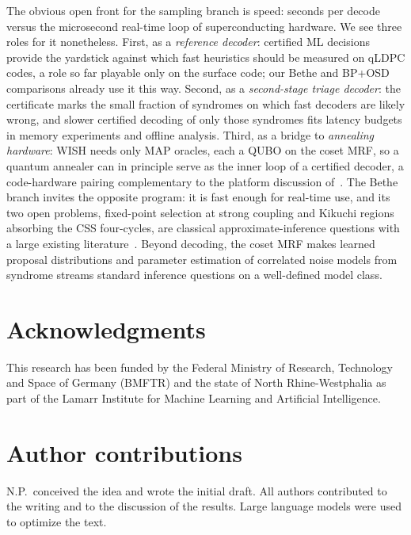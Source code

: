 \documentclass[a4paper,11pt]{quantumarticle}
\theoremstyle{definition}
\begin{document}
The obvious open front for the sampling branch is speed: seconds per
decode versus the microsecond real-time loop of superconducting hardware.
We see three roles for it nonetheless. First, as a \emph{reference
decoder}: certified ML decisions provide the yardstick against which fast
heuristics should be measured on qLDPC codes, a role so far playable only
on the surface code; our Bethe and BP+OSD comparisons already use it this
way. Second, as a \emph{second-stage triage decoder}: the certificate
marks the small fraction of syndromes on which fast decoders are likely
wrong, and slower certified decoding of only those syndromes fits latency
budgets in memory experiments and offline analysis. Third, as a bridge to
\emph{annealing hardware}: WISH needs only MAP oracles, each a QUBO on the
coset MRF, so a quantum annealer can in principle serve as the inner loop
of a certified decoder, a code-hardware pairing complementary to the
platform discussion of~\cite{bravyi2024, xu2024}. The Bethe branch invites
the opposite program: it is fast enough for real-time use, and its two
open problems, fixed-point selection at strong coupling and
Kikuchi regions absorbing the CSS four-cycles, are classical
approximate-inference questions with a large existing
literature~\cite{yedidia2005}. Beyond decoding, the coset MRF makes
learned proposal distributions and parameter estimation of correlated
noise models from syndrome streams standard inference questions on a
well-defined model class.

\section*{Acknowledgments}
This research has been funded by the Federal Ministry of Research,
Technology and Space of Germany (BMFTR) and the state of North
Rhine-Westphalia as part of the Lamarr Institute for Machine Learning
and Artificial Intelligence.

\section*{Author contributions}
N.P.\ conceived the idea and wrote the initial draft. All authors
contributed to the writing and to the discussion of the results. Large
language models were used to optimize the text.



\end{document}
